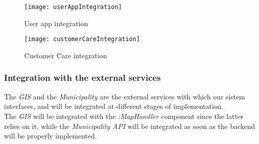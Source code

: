             \begin{figure}[h]
                \centering
                \texttt{[image: userAppIntegration]}
                \caption{
                    \label{fig:userAppIntegration} 
                    User app integration
                }
            \end{figure}
             
            \begin{figure}[h]
                \centering
                \texttt{[image: customerCareIntegration]}
                \caption{
                    \label{fig:customerCareIntegration} 
                    Customer Care integration
                }
            \end{figure}

        \subsubsection{Integration with the external services}
            
            The \emph{GIS} and the \emph{Municipality} are the external services with which our sistem interfaces, and will be
            integrated at different stages of implementation.\\
            The \emph{GIS} will be integrated with the \emph{:MapHandler} component since the latter relies on it, 
            while the \emph{Municipality API} will be integrated as soon as the backend will be properly implemented.


        



